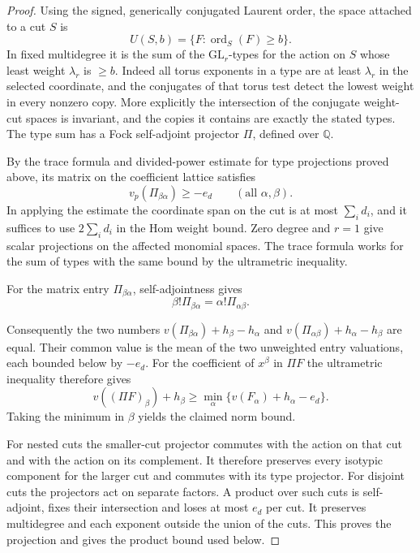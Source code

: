 \begin{proof}
Using the signed, generically conjugated Laurent order, the space attached to a cut \(S\) is
\[
 U(S,b)=\{F:\operatorname{ord}_S(F)\ge b\}.
\]
In fixed
multidegree it is the sum of the \(\mathrm{GL}_r\)-types
for the action on \(S\) whose least weight \(\lambda_r\) is
\(\ge b\). Indeed all torus exponents in a type are at least
\(\lambda_r\) in the selected coordinate, and the conjugates
of that torus test detect the lowest weight in every nonzero
copy. More explicitly the intersection of the conjugate
weight-cut spaces is invariant, and the copies it contains
are exactly the stated types. The type sum has a Fock
self-adjoint projector \(\Pi\), defined over \(\mathbb Q\).

By the trace formula and divided-power estimate for type
projections proved above, its matrix on the coefficient lattice satisfies
\[
 v_p(\Pi_{\beta\alpha})\ge-e_d\qquad(\text{all }\alpha,\beta).
\]
In applying the
estimate the coordinate span on the cut is at most \(\sum_i d_i\),
and it suffices to use \(2\sum_i d_i\) in the Hom weight bound.
Zero degree and \(r=1\) give scalar projections on the affected
monomial spaces. The trace formula works for the sum of types
with the same bound by the ultrametric inequality.

For the matrix entry \(\Pi_{\beta\alpha}\), self-adjointness
gives
\[
 \beta!\Pi_{\beta\alpha}=\alpha!\Pi_{\alpha\beta}.
\]

Consequently the two numbers
\(v(\Pi_{\beta\alpha})+h_\beta-h_\alpha\) and
\(v(\Pi_{\alpha\beta})+h_\alpha-h_\beta\) are equal.
Their common value is the mean of the two unweighted
entry valuations, each bounded below by \(-e_d\).
For the coefficient of \(x^\beta\) in \(\Pi F\) the
ultrametric inequality therefore gives
\[
 v((\Pi F)_\beta)+h_\beta
    \ge\min_\alpha\{v(F_\alpha)+h_\alpha-e_d\}.
\]
Taking the minimum in \(\beta\) yields the claimed norm bound.

For nested cuts the smaller-cut projector commutes with
the action on that cut and with the action on its complement.
It therefore preserves every isotypic component for the
larger cut and commutes with its type projector. For disjoint
cuts the projectors act on separate factors. A product over
such cuts is self-adjoint, fixes their intersection and loses
at most \(e_d\) per cut. It preserves multidegree and each
exponent outside the union of the cuts. This proves the projection and gives the product bound used below.

\end{proof}

